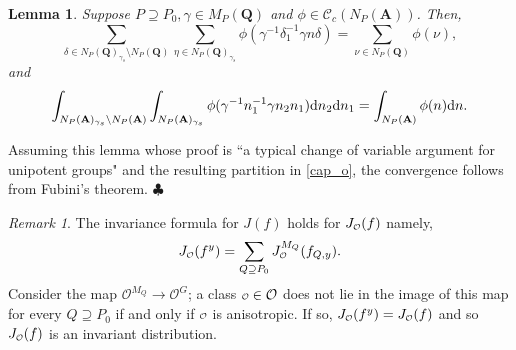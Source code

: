 \documentclass[11pt]{amsart}
\renewcommand\qedsymbol{$\clubsuit$}
\def\A{\mathbf A}
\def\Q{\mathbf Q}
\def\CCC{\mathcal C}
\def\O{\mathcal O}
\def\o{\scalebox{0.8}{$\scriptstyle\mathcal{O}$}}
\def\d{\text d}
\def\bs{\setminus} 			%
\newtheorem{lemma}[theorem]{Lemma}
\theoremstyle{remark}
\newtheorem{remark}[theorem]{Remark}
\begin{document}
\begin{lemma}
	Suppose $P \supseteq P_0, \gamma \in M_P(\Q)$ and $\phi \in \CCC_c(N_P(\A))$. Then,
	\[ \sum_{\delta \in N_P(\Q)_{\gamma_s} \bs N_P(\Q)} \sum_{\eta \in N_P(\Q)_{\gamma_s}} 
			\phi(\gamma^{-1} \delta_1^{-1} \gamma n \delta) = \sum_{\nu \in N_P(\Q)} \phi(\nu), \]
	and
	\[ \int_{N_P(\A)_{\gamma_s} \bs N_P(\A)} \int_{N_P(\A)_{\gamma_s}} \phi(\gamma^{-1} n_1^{-1} \gamma n_2 n_1) 
			\d n_2 \d n_1 = \int_{N_P(\A)} \phi(n) \d n. \]
\end{lemma}
Assuming this lemma whose proof is ``a typical change of variable argument for unipotent groups" and the resulting partition in \cref{cap_o}, the convergence follows from Fubini's theorem. \qedsymbol

\begin{remark}
	The invariance formula for $J(f)$ holds for $J_{\o}(f)$ namely,
	\[ J_{\o}(f^y) = \sum_{Q \supseteq P_0} J_{\o}^{M_Q}(f_{Q, y}). \]
	Consider the map $\O^{M_Q} \to \O^G$; a class $\o \in \O$ does not lie in the image of this map for every $Q \supseteq P_0$ if and only if $\o$ is anisotropic. If so, $J_{\o}(f^y) = J_{\o}(f)$ and so $J_{\o}(f)$ is an invariant distribution. 
\end{remark}
\end{document}
